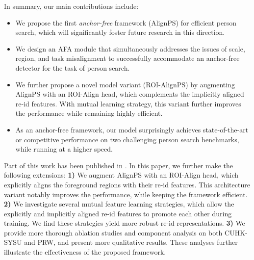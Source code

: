 \documentclass[journal]{IEEEtran}
\begin{document}
In summary, our main contributions include:
\begin{itemize}
\setlength{\itemsep}{0pt}
	\setlength{\parsep}{-3pt}
	\setlength{\parskip}{-0pt}
	\setlength{\leftmargin}{-15pt}
\item We propose the first \emph{anchor-free} framework (AlignPS) for efficient person search, which will significantly foster future research in this direction.
    \item We design an AFA module that simultaneously addresses the issues of scale, region, and task misalignment to successfully accommodate an anchor-free detector for the task of person search.
    \item We further propose a novel model variant (ROI-AlignPS) by augmenting AlignPS with an ROI-Align head, which complements the implicitly aligned re-id features. With mutual learning strategy, this variant further improves the performance while remaining highly efficient.
    \item As an anchor-free framework, our model surprisingly achieves state-of-the-art or competitive performance on two challenging person search benchmarks, while running at a higher speed.
\end{itemize}

Part of this work has been published in \cite{Yan_2021_CVPR}. In this paper, we further make the following extensions: \textbf{1)} We augment AlignPS with an ROI-Align head, which explicitly aligns the foreground regions with their re-id features. This architecture variant notably improves the performance, while keeping the framework efficient. \textbf{2)} We investigate several mutual feature learning strategies, which allow the explicitly and implicitly aligned re-id features to promote each other during training. We find these strategies yield more robust re-id representations. \textbf{3)} We provide more thorough ablation studies and component analysis on both CUHK-SYSU and PRW, and present more qualitative results. These analyses further illustrate the effectiveness of the proposed framework.
\end{document}

